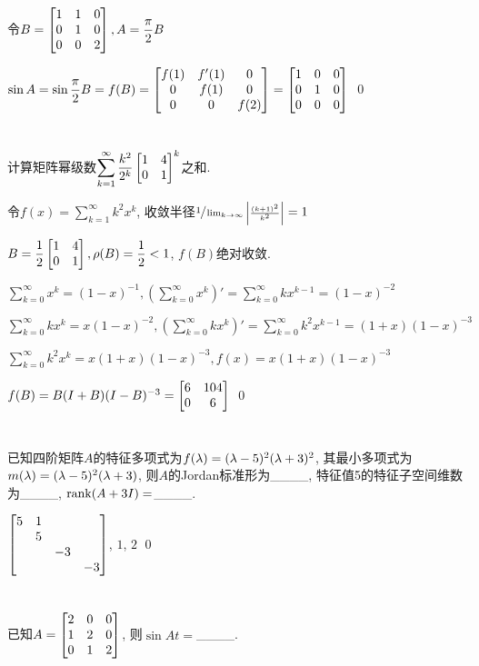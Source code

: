 \documentclass{matrix-homework}
\begin{document}
\answer
令$B=\begin{bmatrix}1&1&0\\0&1&0\\0&0&2\end{bmatrix}, A=\dfrac{\pi}{2}B$

$\sin A=\sin \dfrac{\pi}{2}B=f(B)=\begin{bmatrix}f(1)&f'(1)&0\\0&f(1)&0\\0&0&f(2)\end{bmatrix}=\begin{bmatrix}1&0&0\\0&1&0\\0&0&0\end{bmatrix}$
\qed


\section{}
计算矩阵幂级数$\displaystyle\sum_{k=1}^{\infty}\frac{k^2}{2^k}\begin{bmatrix}1&4\\0&1\end{bmatrix}^k$之和.

\answer
令$f(x)=\displaystyle\sum_{k=1}^{\infty}k^2x^k$, 收敛半径$\sfrac{1}{\lim_{k\to\infty}\left|\frac{(k+1)^2}{k^2}\right|}=1$

$B=\dfrac{1}{2}\begin{bmatrix}1&4\\0&1\end{bmatrix}, \rho(B)=\dfrac{1}{2}<1$, $f(B)$绝对收敛.

$\displaystyle\sum_{k=0}^{\infty}x^k=(1-x)^{-1}, \left(\sum_{k=0}^{\infty}x^k\right)'=\sum_{k=0}^{\infty}kx^{k-1}=(1-x)^{-2}$

$\displaystyle\sum_{k=0}^{\infty}kx^{k}=x(1-x)^{-2}, \left(\sum_{k=0}^{\infty}kx^k\right)'=\sum_{k=0}^{\infty}k^2x^{k-1}=(1+x)(1-x)^{-3}$

$\displaystyle\sum_{k=0}^{\infty}k^2x^k=x(1+x)(1-x)^{-3}, f(x)=x(1+x)(1-x)^{-3}$

$f(B)=B(I+B)(I-B)^{-3}=\begin{bmatrix}6&104\\0&6\end{bmatrix}$
\qed

\section{}
已知四阶矩阵$A$的特征多项式为$f(\lambda)=(\lambda-5)^2(\lambda+3)^2$, 其最小多项式为$m(\lambda)=(\lambda-5)^2(\lambda+3)$, 则$A$的Jordan标准形为\_\_\_\_, 特征值5的特征子空间维数为\_\_\_\_, $\mathrm{rank}(A+3I)=$\_\_\_\_.

\answer
$\begin{bmatrix}5&1\\&5\\&&-3\\&&&-3\end{bmatrix}$, $1$, $2$
\qed


\section{}
已知$A=\begin{bmatrix}2&0&0\\1&2&0\\0&1&2\end{bmatrix}$, 则$\sin At=$\_\_\_\_.
\end{document}
